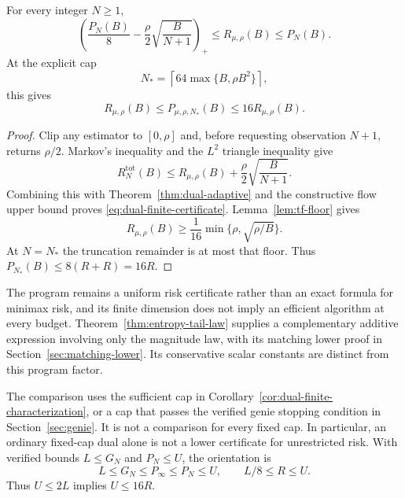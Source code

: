 \begin{corollary}
\label{cor:dual-finite-characterization}
For every integer $N\ge1$,
\begin{equation}
 \left(\frac{P_N(B)}8-
       \frac\rho2\sqrt{\frac B{N+1}}\right)_+
 \le R_{\mu,\rho}(B)\le P_N(B).
 \label{eq:dual-finite-certificate}
\end{equation}
At the explicit cap
\[
 N_*=\left\lceil64\max\{B,\rho B^2\}\right\rceil,
\]
this gives
\begin{equation}
 \boxed{R_{\mu,\rho}(B)\le P_{\mu,\rho,N_*}(B)
                         \le16R_{\mu,\rho}(B).}
 \label{eq:dual-factor-sixteen}
\end{equation}
\end{corollary}

\begin{proof}
Clip any estimator to
$[0,\rho]$ and, before requesting observation $N+1$, returns $\rho/2$.
Markov's inequality and the $L^2$ triangle inequality give
\[
 R_N^{\mathrm{tot}}(B)
 \le R_{\mu,\rho}(B)+\frac\rho2\sqrt{\frac B{N+1}}.
\]
Combining this with Theorem~\ref{thm:dual-adaptive} and the constructive
flow upper bound proves \eqref{eq:dual-finite-certificate}.
Lemma~\ref{lem:tf-floor} gives
\[
 R_{\mu,\rho}(B)\ge\frac1{16}
                 \min\{\rho,\sqrt{\rho/B}\}.
\]
At $N=N_*$ the truncation remainder is at most that floor. Thus
$P_{N_*}(B)\le8(R+R)=16R$.
\end{proof}

The program remains a uniform risk certificate rather than an exact formula
for minimax risk, and its finite dimension does not imply an efficient
algorithm at every budget. Theorem~\ref{thm:entropy-tail-law} supplies a
complementary additive expression involving only the magnitude law, with
its matching lower proof in Section~\ref{sec:matching-lower}. Its
conservative scalar constants are distinct from this program factor.


\begin{remark}
The comparison uses the sufficient cap in
Corollary~\ref{cor:dual-finite-characterization}, or a cap that passes
the verified genie stopping condition in Section~\ref{sec:genie}.
It is not a comparison for every fixed cap. In particular, an ordinary
fixed-cap dual alone is not a lower certificate for unrestricted risk.
With verified bounds $L\le G_N$ and $P_N\le U$, the orientation is
\[
 L\le G_N\le P_\infty\le P_N\le U,\qquad L/8\le R\le U.
\]
Thus $U\le2L$ implies $U\le16R$.
\end{remark}
